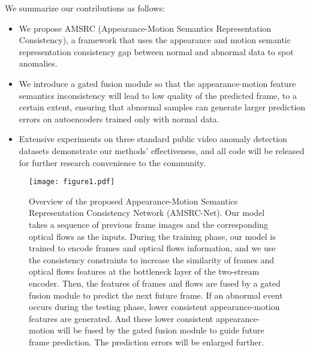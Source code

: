 \documentclass[sigconf]{acmart}
\begin{document}
We summarize our contributions as follows: 
\begin{itemize}
  \item We propose AMSRC (Appearance-Motion Semantics Representation Consistency), a framework that uses the appearance and motion semantic representation consistency gap between normal and abnormal data to spot anomalies. 
  \item We introduce a gated fusion module so that the appearance-motion feature semantics inconsistency will lead to low quality of the predicted frame, to a certain extent, ensuring that abnormal samples can generate larger prediction errors on autoencoders trained only with normal data.
  \item Extensive experiments on three standard public video anomaly detection datasets demonstrate our methods’ effectiveness, and all code will be released for further research convenience to the community.
\end{itemize}
\begin{figure*}[ht]
	\centering
	\texttt{[image: figure1.pdf]}
	\caption{Overview of the proposed Appearance-Motion Semantics Representation Consistency Network (AMSRC-Net). Our model takes a sequence of previous frame images and the corresponding optical flows as the inputs. During the training phase, our model is trained to encode frames and optical flows information, and we use the consistency constraints to increase the similarity of frames and optical flows features at the bottleneck layer of the two-stream encoder. Then, the features of frames and flows are fused by a gated fusion module to predict the next future frame. If an abnormal event occurs during the testing phase, lower consistent appearance-motion features are generated. And these lower consistent appearance-motion will be fused by the gated fusion module to guide future frame prediction. The prediction errors will be enlarged further.}
	\label{p1}
\end{figure*}
\end{document}
